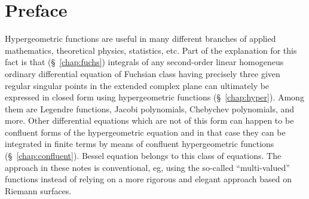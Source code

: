 \chapter*{Preface}

Hypergeometric functions  are useful in many different branches of applied
mathematics, theoretical physics, statistics, etc.  Part of the  explanation for
this fact is that (\S~\ref{chap:fuchs}) integrals of any
second-order linear homogeneus ordinary differential equation of Fuchsian class
having precisely three given regular singular points in the extended complex
plane can ultimately be expressed in closed form using hypergeometric
functions (\S~\ref{chap:hyper}). Among them are Legendre
functions, Jacobi polynomials, Chebychev polynomials, and more.  Other differential
equations which are not of this form can happen to 
be confluent forms of the hypergeometric equation and in that case
they can be integrated in finite terms by means of confluent hypergeometric
functions (\S~\ref{chap:confluent}). Bessel equation belongs to this class of
equations. The approach in these notes is conventional, eg, using the so-called ``multi-valued'' functions instead of relying on a more rigorous and elegant approach based on Riemann surfaces.

\smallskip

\noindent\textsw{\myLocation, \myTime}


\begin{flushright}
        \myName
\end{flushright}


